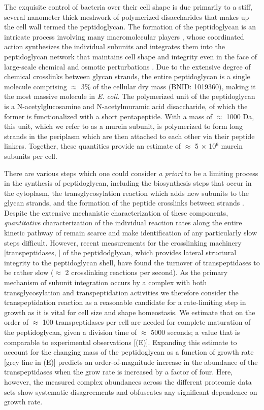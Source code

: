 The exquisite control of bacteria over their cell shape is due primarily to a
stiff, several nanometer thick meshwork of polymerized disaccharides that makes
up the cell wall termed the peptidoglycan. The formation of the peptidoglycan is
an intricate process involving many macromolecular players \citep{shi2018,
morgenstein2015}, whose coordinated action synthesizes the individual subunits
and integrates them into the peptidoglycan network that maintains cell shape and
integrity even in the face of large-scale chemical and osmotic perturbations
\citep{harris2018,shi2018}. Due to the extensive degree of chemical crosslinks
between glycan strands, the entire peptidoglycan is a single molecule comprising
$\approx$ 3\% of the cellular dry mass (BNID: 1019360), making it the most
massive molecule in \textit{E. coli}. The polymerized unit of the peptidoglycan
is a N-acetylglucosamine and N-acetylmuramic acid disaccharide, of which the
former is functionalized with a short pentapeptide. With a mass of $\approx$
1000 Da, this unit, which we refer to as a murein subunit, is polymerized to
form long strands in the periplasm which are then attached to each other via
their peptide linkers. Together, these quantities provide an estimate of
$\approx$ 5 $\times$ 10$^6$ murein subunits per cell.

There are various steps which one could consider \textit{a priori} to be a
limiting process in the synthesis of peptidoglycan, including the biosynthesis
steps that occur in the cytoplasm, the transglycosylation reaction which adds
new subunits to the glycan strands, and the formation of the peptide crosslinks
between strands \citep{shi2018,morgenstein2015,lovering2012,barreteau2008}.
Despite the extensive mechanistic characterization of these components,
\textit{quantitative} characterization of the individual reaction rates along
the entire kinetic pathway of remain scarce and make identification of any
particularly slow steps difficult. However, recent measurements for the
crosslinking machinery [transpeptidases, \cite{catherwood2020}] of the
peptidodglycan, which provides lateral structural integrity to the peptidoglycan
shell, have found the turnover of transpeptidases to be rather slow ($\approx$ 2
crosslinking reactions per second). As the primary mechanism of subunit
integration occurs by a complex with both transglycosylation and
transpeptidation activities \citep{shi2018} we therefore consider the
transpeptidation reaction as a reasonable candidate for a rate-limiting step in
growth as it is vital for cell size and shape homeostasis. We estimate that on
the order of $\approx$ 100 transpeptidases per cell are needed for complete
maturation of the peptidoglycan, given a division time of $\approx$ 5000
seconds; a value that is comparable to experimental observations
[(E)]. Expanding this estimate to account for the
changing mass of the peptidoglycan as a function of growth rate [grey line in
(E)] predicts an order-of-magnitude increase in
the abundance of the transpeptidases when the grow rate is increased by a factor
of four. Here, however, the measured complex abundances across the different
proteomic data sets show systematic disagreements and obfuscates any significant
dependence on growth rate.

